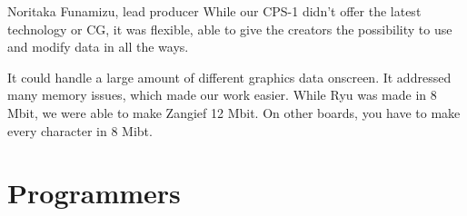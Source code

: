 \begin{q}{Noritaka Funamizu, lead producer\cite{retro}}
  While our CPS-1 didn't offer the latest technology or CG, it was flexible, able to give the creators the possibility to use and modify data in all the ways.


  It could handle a large amount of different graphics data onscreen. It addressed many memory issues, which made our work easier. While Ryu was made in 8 Mbit, we were able to make Zangief 12 Mbit. On other boards, you have to make every character in 8 Mibt.
  \end{q}

\section{Programmers}






